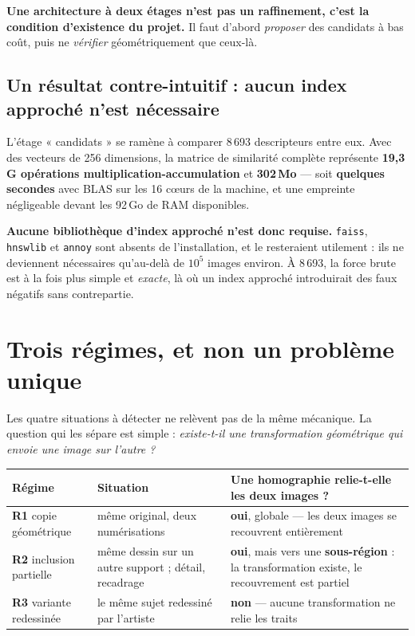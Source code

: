 \documentclass[11pt,a4paper]{article}
\newcommand{\aretenir}[1]{%
  \par\medskip
  \noindent\colorbox{encadre}{%
    \begin{minipage}{\dimexpr\linewidth-2\fboxsep}
      \vspace{2pt}#1\vspace{2pt}
    \end{minipage}}%
  \par\medskip
}
\newcommand{\alerte}[1]{\textcolor{alerte}{\textbf{#1}}}
\newcommand{\bon}[1]{\textcolor{vert}{\textbf{#1}}}
\begin{document}
\aretenir{\textbf{Une architecture à deux étages n'est pas un raffinement, c'est
la condition d'existence du projet.} Il faut d'abord \emph{proposer} des
candidats à bas coût, puis ne \emph{vérifier} géométriquement que ceux-là.}

\subsection{Un résultat contre-intuitif : aucun index approché n'est nécessaire}

L'étage « candidats » se ramène à comparer 8\,693 descripteurs entre eux. Avec
des vecteurs de 256 dimensions, la matrice de similarité complète représente
\textbf{19,3 G opérations multiplication-accumulation} et \textbf{302\,Mo} —
soit \textbf{quelques secondes} avec BLAS sur les 16 c\oe urs de la machine, et
une empreinte négligeable devant les 92\,Go de RAM disponibles.

\alerte{Aucune bibliothèque d'index approché n'est donc requise.}
\texttt{faiss}, \texttt{hnswlib} et \texttt{annoy} sont absents de
l'installation, et le resteraient utilement : ils ne deviennent nécessaires
qu'au-delà de $10^5$ images environ. À 8\,693, la force brute est à la fois plus
simple et \emph{exacte}, là où un index approché introduirait des faux négatifs
sans contrepartie.

\section{Trois régimes, et non un problème unique}
\label{sec:regimes}

Les quatre situations à détecter ne relèvent pas de la même mécanique. La
question qui les sépare est simple : \emph{existe-t-il une transformation
géométrique qui envoie une image sur l'autre ?}

\begin{table}[h]
\centering\small
\begin{tabularx}{\textwidth}{llY}
\toprule
\textbf{Régime} & \textbf{Situation} & \textbf{Une homographie relie-t-elle les deux images ?} \\
\midrule
\textbf{R1} copie géométrique & même original, deux numérisations
  & \bon{oui}, globale — les deux images se recouvrent entièrement \\
\addlinespace
\textbf{R2} inclusion partielle & même dessin sur un autre support ;
  détail, recadrage
  & \bon{oui}, mais vers une \textbf{sous-région} : la transformation existe,
    le recouvrement est partiel \\
\addlinespace
\textbf{R3} variante redessinée & le même sujet redessiné par l'artiste
  & \alerte{non} — aucune transformation ne relie les traits \\
\bottomrule
\end{tabularx}
\end{table}
\end{document}
